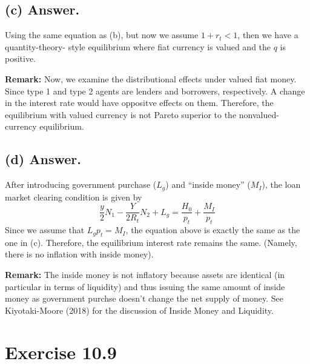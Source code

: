 \documentclass[11pt]{article}
\theoremstyle{definition}
\theoremstyle{boldtitle} %
\numberwithin{equation}{section}
\numberwithin{figure}{section}
\numberwithin{table}{section}
\begin{document}
\subsection{(c) Answer.}
Using the same equation as (b), but now we assume $1 + r_t < 1$,
then we have a quantity-theory- style equilibrium where fiat currency is valued and 
the $q$ is positive. 

\noindent \textbf{Remark:} Now, we examine the distributional effects under valued fiat money.
Since type 1 and type 2 agents are lenders and borrowers, respectively.
A change in the interest rate would have oppositve effects on them.
Therefore, the equilibrium with valued currency is not Pareto superior 
to the nonvalued- currency equilibrium.

\subsection{(d) Answer.}
After introducing government purchase ($L_g$) and ``inside money'' ($M_I$), 
the loan market clearing condition is given by 
\[
\frac{y}{2} N_1 - \frac{Y}{2 R_t} N_2 + L_g = \frac{H_0}{p_t} + \frac{M_I}{p_t}
\]
Since we assume that $L_g p_t = M_I$, the equation above is exactly the same as the one in (c).
Therefore, the equilibrium interest rate remains the same. 
(Namely, there is no inflation with inside money).

\noindent \textbf{Remark:} The inside money is not inflatory because assets are identical (in particular in terms of liquidity) 
and thus issuing the same amount of inside money as government purchse doesn't change the net supply of money.
See Kiyotaki-Moore (2018) for the discussion of Inside Money and Liquidity.

\section{Exercise 10.9}
\end{document}
